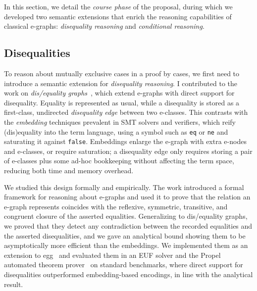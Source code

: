 In this section, we detail the \textit{course phase} of the proposal, during
which we developed two semantic extensions that enrich the reasoning
capabilities of classical e-graphs: \textit{disequality reasoning} and 
\textit{conditional reasoning}.

\subsection{Disequalities}
To reason about mutually exclusive cases in a proof by cases, we first need to
introduce a semantic extension for \textit{disequality reasoning}.
I contributed to the work on \textit{dis/equality
graphs}~\cite{zakhour2025disequality}, which extend e-graphs with direct support
for disequality.
Equality is represented as usual, while a disequality is stored as a
first-class, undirected \textit{disequality edge} between two e-classes. This
contrasts with the \textit{embedding} techniques prevalent in SMT solvers and
verifiers, which reify (dis)equality into the term language, using a symbol such
as \texttt{eq} or \texttt{ne} and saturating it against \texttt{false}.
Embeddings enlarge the e-graph with extra e-nodes and e-classes, or require
saturation; a disequality edge only requires storing a pair of e-classes plus
some ad-hoc bookkeeping without affecting the term space, reducing both time and
memory overhead.

We studied this design formally and empirically. The work introduced a formal
framework for reasoning about e-graphs and used it to prove that the relation an
e-graph represents coincides with the reflexive, symmetric, transitive, and
congruent closure of the asserted equalities. Generalizing to dis/equality
graphs, we proved that they detect any contradiction between the recorded
equalities and the asserted disequalities, and we gave an analytical bound
showing them to be asymptotically more efficient than the embeddings.
We implemented them as an
extension to egg~\cite{willsey2021egg} and evaluated them in an EUF solver and
the Propel automated theorem prover~\cite{zakhour2024algebraic, zakhour2023crdt} on
standard benchmarks, where direct support for disequalities outperformed 
embedding-based encodings, in line with the analytical result.

